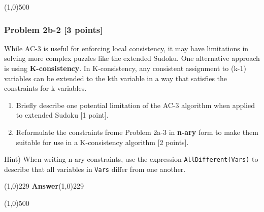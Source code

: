\documentclass{article}%
\begin{document}
\line(1,0){500}
\subsubsection*{Problem 2b-2 [3 points]}
While AC-3 is useful for enforcing local consistency, it may have limitations in solving more complex puzzles like the extended Sudoku. One alternative approach is using \textbf{K-consistency}. In K-consistency, any consistent assignment to (k-1) variables can be extended to the kth variable in a way that satisfies the constraints for k variables.
\begin{enumerate}[noitemsep]
    \item Briefly describe one potential limitation of the AC-3 algorithm when applied to extended Sudoku [1 point].
    \item Reformulate the constraints frome Problem 2a-3 in \textbf{n-ary} form to make them suitable for use in a K-consistency algorithm [2 points].
\end{enumerate}

Hint) When writing n-ary constraints, use the expression \verb_AllDifferent(Vars)_ to describe that all variables in \verb_Vars_ differ from one another.

\line(1,0){229}\textbf{ Answer}\line(1,0){229}

\line(1,0){500}
\end{document}

